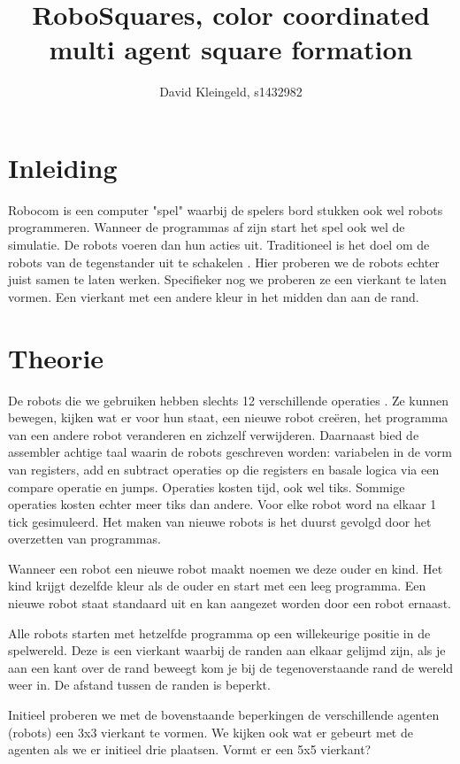 \documentclass[10pt]{article}
\author{David Kleingeld, s1432982}
\title{RoboSquares, color coordinated multi agent square formation}
\begin{document}

\maketitle

\section{Inleiding}

Robocom is een computer "spel" waarbij de spelers bord stukken ook wel robots programmeren. Wanneer de programmas af zijn start het spel ook wel de simulatie. De robots voeren dan hun acties uit. Traditioneel is het doel om de robots van de tegenstander uit te schakelen \cite{robocom_program}. Hier proberen we de robots echter juist samen te laten werken. Specifieker nog we proberen ze een vierkant te laten vormen. Een vierkant met een andere kleur in het midden dan aan de rand.

\section{Theorie}

De robots die we gebruiken hebben slechts 12 verschillende operaties \cite{robocom_docs}. Ze kunnen bewegen, kijken wat er voor hun staat, een nieuwe robot creëren, het programma van een andere robot veranderen en zichzelf verwijderen. Daarnaast bied de assembler achtige taal waarin de robots geschreven worden: variabelen in de vorm van registers, add en subtract operaties op die registers en basale logica via een compare operatie en jumps. Operaties kosten tijd, ook wel tiks. Sommige operaties kosten echter meer tiks dan andere. Voor elke robot word na elkaar 1 tick gesimuleerd. Het maken van nieuwe robots is het duurst gevolgd door het overzetten van programmas.

Wanneer een robot een nieuwe robot maakt noemen we deze ouder en kind. Het kind krijgt dezelfde kleur als de ouder en start met een leeg programma. Een nieuwe robot staat standaard uit en kan aangezet worden door een robot ernaast. 

Alle robots starten met hetzelfde programma op een willekeurige positie in de spelwereld. Deze is een vierkant waarbij de randen aan elkaar gelijmd zijn, als je aan een kant over de rand beweegt kom je bij de tegenoverstaande rand de wereld weer in. De afstand tussen de randen is beperkt.

Initieel proberen we met de bovenstaande beperkingen de verschillende agenten (robots) een 3x3 vierkant te vormen. We kijken ook wat er gebeurt met de agenten als we er initieel drie plaatsen. Vormt er een 5x5 vierkant? 
\end{document}
